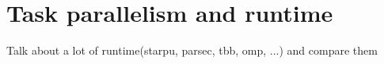 \section{Task parallelism and runtime}
Talk about a lot of runtime(starpu, parsec, tbb, omp, ...) and compare them
